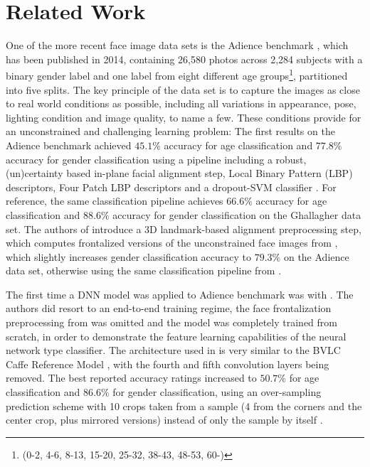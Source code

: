 \documentclass[10pt,twocolumn,letterpaper]{article}
\begin{document}
\section{Related Work}
\label{sec:relatedwork}

One of the more recent face image data sets is the Adience benchmark \cite{eidinger2014age}, which has been published in 2014, containing 26,580 photos across 2,284 subjects with a binary gender label and one label from eight different age groups\footnote{(0-2, 4-6, 8-13, 15-20, 25-32, 38-43, 48-53, 60-)}, partitioned into five splits. The key principle of the data set is to capture the images as close to real world conditions as possible, including all variations in appearance, pose, lighting condition and image quality, to name a few. These conditions provide for an unconstrained and challenging learning problem: The first results on the Adience benchmark achieved $45.1\%$ accuracy for age classification and $77.8\%$ accuracy for gender classification using a  pipeline including a robust, (un)certainty based in-plane facial alignment step, Local Binary Pattern (LBP) descriptors, Four Patch LBP descriptors and a dropout-SVM classifier \cite{eidinger2014age}. For reference, the same classification pipeline achieves $66.6\%$ accuracy for age classification and $88.6\%$ accuracy for gender classification on the Ghallagher data set.
The authors of \cite{hassner2015effective} introduce a 3D landmark-based alignment preprocessing step, which computes frontalized versions of the unconstrained face images from \cite{eidinger2014age}, which slightly increases gender classification accuracy to $79.3\%$ on the Adience data set, otherwise using the same classification pipeline from \cite{eidinger2014age}.

The first time a DNN model was applied to Adience benchmark was with \cite{levi2015age}. The authors did resort to an end-to-end training regime, \eg the face frontalization preprocessing from \cite{hassner2015effective} was omitted and the model was completely trained from scratch, in order to demonstrate the feature learning capabilities of the neural network type classifier. The architecture used in \cite{levi2015age} is very similar to the BVLC Caffe Reference Model \cite{jia2014caffe}, with the fourth and fifth convolution layers being removed. The best reported accuracy ratings increased to $50.7\%$ for age classification and $86.6\%$ for gender classification, using an over-sampling prediction scheme with 10 crops taken from a sample (4 from the corners and the center crop, plus mirrored versions) instead of only the sample by itself \cite{levi2015age}.
\end{document}

